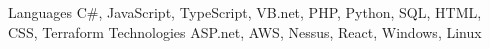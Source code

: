 \begin{cvskills}
  \cvskill
    {Languages}
    {C\#, JavaScript, TypeScript, VB.net, PHP, Python, SQL, HTML, CSS, Terraform}
  \cvskill
    {Technologies}
    {ASP.net, AWS, Nessus, React, Windows, Linux}
\end{cvskills}

